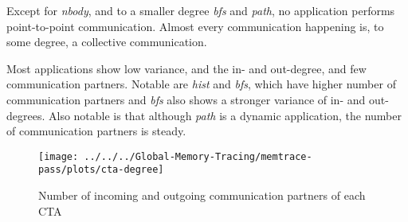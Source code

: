 Except for \textit{nbody}, and to a smaller degree \textit{bfs} and \textit{path}, no application performs point-to-point communication. Almost every communication happening is, to some degree, a collective communication.

Most applications show low variance, and the in- and out-degree, and few communication partners. Notable are \textit{hist} and \textit{bfs}, which have higher number of communication partners and \textit{bfs} also shows a stronger variance of in- and out-degrees. Also notable is that although \textit{path} is a dynamic application, the number of communication partners is steady.

\begin{figure}[h!]
	\texttt{[image: ../../../Global-Memory-Tracing/memtrace-pass/plots/cta-degree]}
	\caption{Number of incoming and outgoing communication partners of each CTA}
	\label{fig:Cta-degree}
\end{figure}
